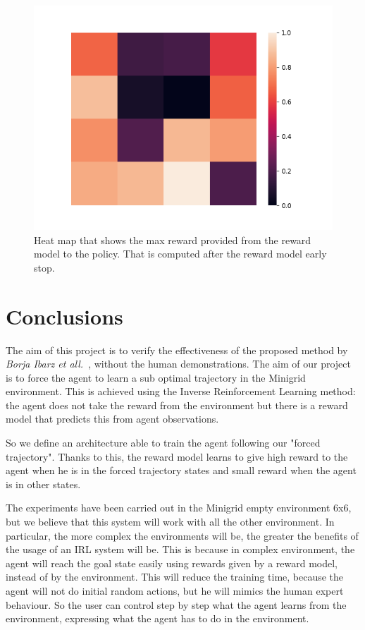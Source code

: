 \begin{figure}[t!]
    \includegraphics[width=\linewidth]{data/max_heatmap.png} 
    \caption{Heat map that shows the max reward provided from the reward model to the policy. That is computed after the reward model early stop.}
	\label{fig:heatmap}%
\end{figure}

\section{Conclusions}
The aim of this project is to verify the effectiveness of the proposed method by \textit{Borja Ibarz et all.}\ \cite{NIPS2018_8025}, without the human demonstrations. The aim of our project is to force the agent to learn a sub optimal trajectory in the Minigrid environment. This is achieved using the Inverse Reinforcement Learning method: the agent does not take the reward from the environment but there is a reward model that predicts this from agent observations. 

So we define an architecture able to train the agent following our "forced trajectory". Thanks to this, the reward model learns to give high reward to the agent when he is in the forced trajectory states and small reward when the agent is in other states.

The experiments have been carried out in the Minigrid empty environment 6x6, but we believe that this system will work with all the other environment. In particular, the more complex the environments will be, the greater the benefits of the usage of an IRL system will be. This is because in complex environment, the agent will reach the goal state easily using rewards given by a reward model, instead of by the environment. This will reduce the training time, because the agent will not do initial random actions, but he will mimics the human expert behaviour. 
So the user can control step by step what the agent learns from the environment, expressing what the agent has to do in the environment.